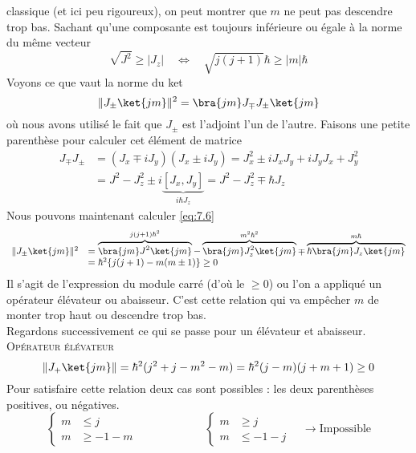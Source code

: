classique (et ici peu rigoureux), on peut montrer que $m$ ne peut pas descendre 
trop bas. Sachant qu'une composante est toujours inférieure ou égale à la norme du 
même vecteur
\begin{equation}
\sqrt{J^2} \geq |J_z|\quad\Leftrightarrow\quad \sqrt{j(j+1)}\hbar \geq |m|\hbar
\end{equation}
Voyons ce que vaut la norme du ket
\begin{equation}
\|J_\pm\ket{jm}\|^2 = \bra{jm}J_\mp J_\pm\ket{jm}
\label{eq:7.6}
\end{equation}
où nous avons utilisé le fait que $J_\pm$ est l'adjoint l'un de l'autre. Faisons 
une petite parenthèse pour calculer cet élément de matrice
\begin{equation}
\begin{array}{ll}
J_\mp J_\pm &= (J_x\mp iJ_y)(J_x\pm iJ_y) = J_x^2\pm iJ_xJ_y+iJ_yJ_x+J_y^2\\
&=J^2-J_z^2 \pm i\underbrace{[J_x,J_y]}_{i\hbar J_z} = J^2-J_z^2 \mp \hbar J_z
\end{array}
\end{equation}
Nous pouvons maintenant calculer \eqref{eq:7.6}
\begin{equation}
\begin{array}{ll}
\|J_\pm\ket{jm}\|^2 &=  \overbrace{\bra{jm}J^2\ket{jm}}^{j(j+1)\hbar^2} - \overbrace{\bra{jm}J_z^2\ket{jm}}^{
m^2\hbar^2}\mp\overbrace{\hbar \bra{jm}J_z\ket{jm}}^{m\hbar}\\
&= \hbar^2\{j(j+1)-m(m\pm 1)\} \geq 0
\end{array}
\end{equation}
Il s'agit de l'expression du module carré (d'où le $\geq 0$) ou l'on a appliqué un opérateur élévateur 
ou abaisseur. C'est cette relation qui va empêcher $m$ de monter trop haut ou descendre trop bas.\\

Regardons successivement ce qui se passe pour un élévateur et abaisseur.\\
	\textsc{Opérateur élévateur}
	\begin{equation}
	\|J_+\ket{jm}\| = \hbar^2(j^2+j-m^2-m) = \hbar^2(j-m)(j+m+1)\geq 0
	\end{equation}
	Pour satisfaire cette relation deux cas sont possibles : les deux parenthèses positives, ou négatives.
	\begin{equation}
	\left\{\begin{array}{ll}
	m &\leq j\\
	m &\geq -1-m
	\end{array}\right.\qquad\qquad\qquad	\left\{\begin{array}{ll}
	m &\geq j\\
	m &\leq -1-j
	\end{array}\right.\quad\rightarrow \text{Impossible}
	\end{equation}
	

